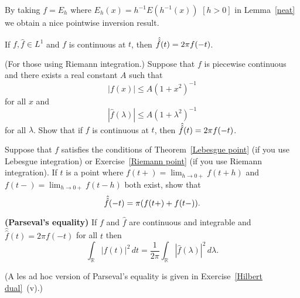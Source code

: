 By taking $f=E_{h}$ where
$E_{h}(x)=h^{-1}E(h^{-1}(x))$ $[h>0]$ in Lemma~\ref{neat}
we obtain a nice pointwise inversion result.
\begin{theorem}\label{Lebesgue point}
If $f,\hat{f}\in L^{1}$ and $f$ is continuous
at $t$, then $\Hat{\Hat{f}}(t)=2\pi f(-t)$.
\end{theorem}
\begin{exercise}\label{Riemann point}
(For those using Riemann integration.)
Suppose that $f$ is piecewise continuous and
there exists a real constant $A$ such that
\[|f(x)|\leq A(1+x^{2})^{-1}\]
for all $x$ and
\[|\hat{f}(\lambda)|\leq A(1+\lambda^{2})^{-1}\]
for all $\lambda$. Show that if $f$ is continuous
at $t$, then $\Hat{\Hat{f}}(t)=2\pi f(-t)$.
\end{exercise}
\begin{exercise} Suppose that $f$ satisfies the conditions
of Theorem~\ref{Lebesgue point} (if you use Lebesgue integration)
or Exercise~\ref{Riemann point} (if you use Riemann integration).
If $t$ is a point where $f(t+)=\lim_{h\rightarrow 0+}f(t+h)$
and $f(t-)=\lim_{h\rightarrow 0+}f(t-h)$ both exist,
show that
\[\Hat{\Hat{f}}(-t)=\pi(f(t+)+f(t-)).\]
\end{exercise}
\begin{lemma} {\bf (Parseval's equality)}
If
$f$ and $\hat{f}$ are continuous and integrable and
$\hat{\hat{f}}(t)=2\pi f(-t)$ for all $t$
then
\[\int_{\mathbb R}|f(t)|^{2}\,dt=
\frac{1}{2\pi}\int_{\mathbb R}|\hat{f}(\lambda)|^{2}\,d\lambda.\]
\end{lemma}
(A les ad hoc version of Parseval's equality is
given in Exercise~\ref{Hilbert dual}~(v).)
